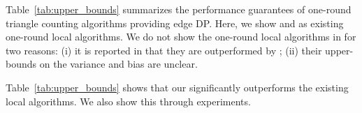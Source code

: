 Table~\ref{tab:upper_bounds} summarizes the performance guarantees of one-round triangle counting algorithms providing edge DP. 
Here, we show \AlgARRTri{} \cite{Imola_USENIX22} and \AlgRRTri{} \cite{Imola_USENIX21} as existing one-round local algorithms. 
We do not show the one-round local algorithms in \cite{Ye_ICDE20,Ye_TKDE21} for two reasons: (i) it is reported in \cite{Imola_USENIX22} that they are outperformed by \AlgRRTri{}; (ii) their upper-bounds on the variance and bias are unclear. 

Table~\ref{tab:upper_bounds} shows that our \AlgWSTriVR{} significantly outperforms the existing local algorithms. 
We also show this through experiments. 




